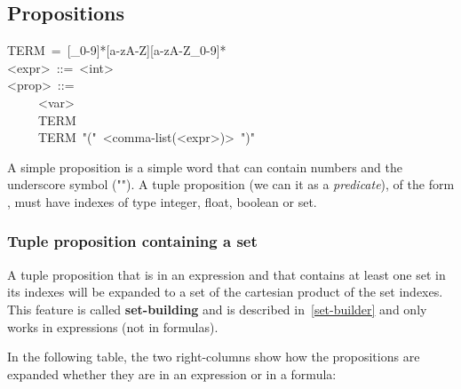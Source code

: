 \subsection{Propositions}\label{sec-propositions}%
\begin{mdpre}%
\noindent TERM~=~{}[\_0-9]*{}[a-zA-Z]{}[a-zA-Z\_0-9]*\\
{\textless{}expr\textgreater{}}~::=~{\textless{}int\textgreater{}}\\
{\textless{}prop\textgreater{}}~::=\\
~~~~\textbar{}~{\textless{}var\textgreater{}}\\
~~~~\textbar{}~TERM\\
~~~~\textbar{}~TERM~"("~{\textless{}comma-list(\textless{}expr\textgreater{})\textgreater{}}~")"%
\end{mdpre}\noindent A simple proposition is a simple word that can contain numbers and the
underscore symbol ("\mdcode{\_}"). A tuple proposition (we can it as a
\emph{predicate}), of the form , must have indexes of type
integer, float, boolean or set.

\subsubsection{Tuple proposition containing a set}\label{tuple-prop-set}%

\noindent A tuple proposition that is in an expression and that contains at least
one set in its indexes will be expanded to a set of the cartesian product
of the set indexes. This feature is called \textbf{set-building} and is
described in~\ref{set-builder} and only works in expressions (not in
formulas).%

In the following table, the two right-columns show how the propositions
are expanded whether they are in an expression or in a formula:%

